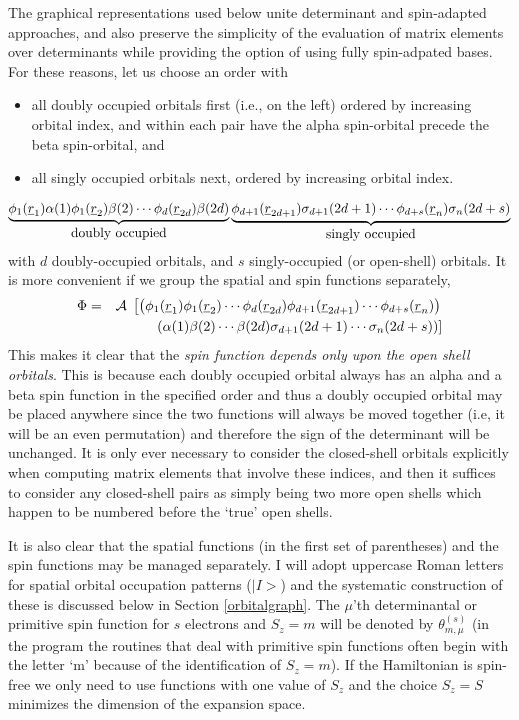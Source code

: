 The graphical representations used below unite determinant and
spin-adapted approaches, and also preserve the simplicity of the
evaluation of matrix elements over determinants while providing the
option of using fully spin-adpated bases.  For these reasons, let us
choose an order with
\begin{itemize}
\item all doubly occupied orbitals first (i.e., on the left) ordered
by increasing orbital index, and within each pair have the alpha
spin-orbital precede the beta spin-orbital, and
\item all singly occupied orbitals next, ordered by increasing orbital
index.
\end{itemize}
\begin{equation}
\underbrace{\phi_{1}(\underline{r}_{1})\alpha(1)\phi_{1}(\underline{r}_{2})\beta(2) \cdots
\phi_{d}(\underline{r}_{2d})\beta(2d)}_{\mbox{doubly occupied}}
\underbrace{\phi_{d+1}(\underline{r}_{2d+1})\sigma_{d+1}(2d+1) \cdots 
\phi_{d+s}(\underline{r}_{n})\sigma_{n}(2d+s)}_{\mbox{singly occupied}}
\end{equation}
with $d$ doubly-occupied orbitals, and $s$ singly-occupied (or
open-shell) orbitals.  
It is more convenient if we group the spatial and spin
functions separately,
\begin{eqnarray}
\Phi & = & {\cal A} \; \left[
\left(\phi_{1}(\underline{r}_{1})\phi_{1}(\underline{r}_{2}) \cdots \phi_{d}(\underline{r}_{2d})
\phi_{d+1}(\underline{r}_{2d+1}) \cdots \phi_{d+s}(\underline{r}_{n}) \right)\right. \\
 & & \left.\left(\alpha(1)\beta(2) \cdots \beta(2d) \sigma_{d+1}(2d+1) \cdots 
\sigma_{n}(2d+s)\right)\right]
\end{eqnarray}
This makes it clear that the {\em spin function depends only upon the
open shell orbitals}.  This is because each doubly occupied orbital
always has an alpha and a beta spin function in the specified order
and thus a doubly occupied orbital may be placed anywhere since the
two functions will always be moved together (i.e, it will be an even
permutation) and therefore the sign of the determinant will be
unchanged.  It is only ever necessary to consider the closed-shell
orbitals explicitly when computing matrix elements that involve these
indices, and then it suffices to consider any closed-shell pairs as
simply being two more open shells which happen to be numbered before
the `true' open shells.

It is also clear that the spatial functions (in the first set of
parentheses) and the spin functions may be managed separately.  I will
adopt uppercase Roman letters for spatial orbital occupation patterns
($|I\! >$) and the systematic construction of these is discussed below
in Section \ref{orbitalgraph}.  The $\mu$'th determinantal or
primitive spin function for $s$ electrons and $S_z = m$ will be
denoted by $\theta^{(s)}_{m,\mu}$ (in the program the routines that
deal with primitive spin functions often begin with the letter `m'
because of the identification of $S_z = m$).  If the Hamiltonian is
spin-free we only need to use functions with one value of $S_z$ and
the choice $S_z=S$ minimizes the dimension of the expansion space.

